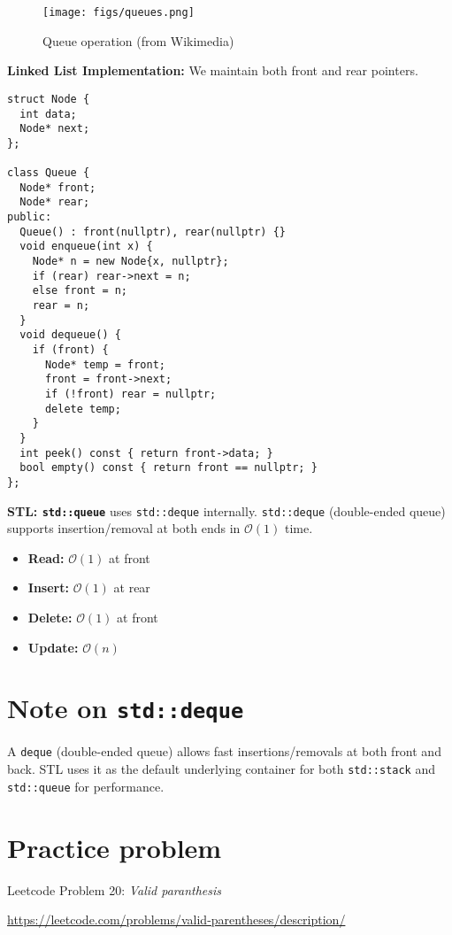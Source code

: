 \documentclass{article}
\begin{document}
\begin{figure}[h]
  \centering
  \texttt{[image: figs/queues.png]}
  \caption{Queue operation (from Wikimedia)}
  \label{fig:queue}
\end{figure}

\textbf{Linked List Implementation:}
We maintain both front and rear pointers.

\begin{lstlisting}[style=cppstyle]
struct Node {
  int data;
  Node* next;
};

class Queue {
  Node* front;
  Node* rear;
public:
  Queue() : front(nullptr), rear(nullptr) {}
  void enqueue(int x) {
    Node* n = new Node{x, nullptr};
    if (rear) rear->next = n;
    else front = n;
    rear = n;
  }
  void dequeue() {
    if (front) {
      Node* temp = front;
      front = front->next;
      if (!front) rear = nullptr;
      delete temp;
    }
  }
  int peek() const { return front->data; }
  bool empty() const { return front == nullptr; }
};
\end{lstlisting}

\textbf{STL: \texttt{std::queue}} uses \texttt{std::deque} internally. \texttt{std::deque} (double-ended queue) supports insertion/removal at both ends in $\mathcal{O}(1)$ time.

\begin{itemize}
  \item \textbf{Read:} $\mathcal{O}(1)$ at front
  \item \textbf{Insert:} $\mathcal{O}(1)$ at rear
  \item \textbf{Delete:} $\mathcal{O}(1)$ at front
  \item \textbf{Update:} $\mathcal{O}(n)$
\end{itemize}

\section{Note on \texttt{std::deque}}
A \texttt{deque} (double-ended queue) allows fast insertions/removals at both front and back. STL uses it as the default underlying container for both \texttt{std::stack} and \texttt{std::queue} for performance.

\section{Practice problem}
Leetcode Problem 20: \textit{Valid paranthesis}

\url{https://leetcode.com/problems/valid-parentheses/description/}
\end{document}

